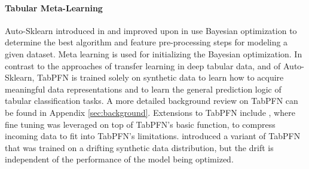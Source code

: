 \paragraph{Tabular Meta-Learning} Auto-Sklearn introduced in \citet{feurer-neurips15a} and improved upon in \citet{feurer2022auto} use Bayesian optimization to determine the best algorithm and feature pre-processing steps for modeling a given dataset. Meta learning is used for initializing the Bayesian optimization. In contrast to the approaches of transfer learning in deep tabular data, and of Auto-Sklearn, TabPFN \citep{muller2021transformers} is trained solely on synthetic data to learn how to acquire meaningful data representations and to learn the general prediction logic of tabular classification tasks. A more detailed background review on TabPFN can be found in Appendix \ref{sec:background}. Extensions to TabPFN include \citet{feuer2024tunetables}, where fine tuning was leveraged on top of TabPFN's basic function, to compress incoming data to fit into TabPFN's limitations. \citet{helli2024driftresilient} introduced a variant of TabPFN that was trained on a drifting synthetic data distribution, but the drift is independent of the performance of the model being optimized.





